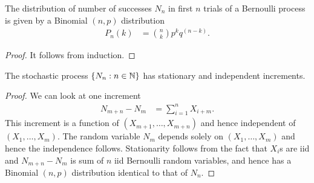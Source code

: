 \documentclass[a4paper,10pt,english]{article}
\begin{document}
\begin{thm} The distribution of number of successes $N_n$ in first $n$ trials of a Bernoulli process is given by a Binomial $(n,p)$ distribution 
\begin{align*}
P_n(k) &= \binom{n}{k}p^kq^{(n-k)}.
\end{align*}
\end{thm}
\begin{proof} 
It follows from induction. 
\end{proof}
\begin{cor} The stochastic process $\{N_n: n \in \mathbb{N}\}$ has stationary and independent increments.
\end{cor}
\begin{proof}
We can look at one increment 
\begin{align*}
N_{m+n}-N_m &= \sum_{i = 1}^{n}X_{i+m}.
\end{align*}
This increment is a function of $(X_{m+1}, \dots, X_{m+n})$ and hence independent of $(X_1, \dots, X_m)$. 
The random variable $N_m$ depends solely on $(X_1, \dots, X_m)$ and hence the independence follows. 
Stationarity follows from the fact that $X_i$s are iid and $N_{m+n}-N_m$ is sum of $n$ iid Bernoulli random variables, 
and hence has a Binomial $(n,p)$ distribution identical to that of $N_n$. 
\end{proof}
\end{document}

